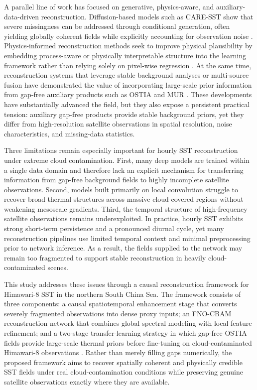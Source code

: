 \documentclass[12pt,reqno]{amsart}
\begin{document}
A parallel line of work has focused on generative, physics-aware, and auxiliary-data-driven reconstruction. Diffusion-based models such as CARE-SST show that severe missingness can be addressed through conditional generation, often yielding globally coherent fields while explicitly accounting for observation noise \cite{choo_2025_caresst}. Physics-informed reconstruction methods seek to improve physical plausibility by embedding process-aware or physically interpretable structure into the learning framework rather than relying solely on pixel-wise regression \cite{young_2024}. At the same time, reconstruction systems that leverage stable background analyses or multi-source fusion have demonstrated the value of incorporating large-scale prior information from gap-free auxiliary products such as OSTIA and MUR \cite{donlon_2012,good_2020_ostia,chin_2017,beauchamp_2025}. These developments have substantially advanced the field, but they also expose a persistent practical tension: auxiliary gap-free products provide stable background priors, yet they differ from high-resolution satellite observations in spatial resolution, noise characteristics, and missing-data statistics.

Three limitations remain especially important for hourly SST reconstruction under extreme cloud contamination. First, many deep models are trained within a single data domain and therefore lack an explicit mechanism for transferring information from gap-free background fields to highly incomplete satellite observations. Second, models built primarily on local convolution struggle to recover broad thermal structures across massive cloud-covered regions without weakening mesoscale gradients. Third, the temporal structure of high-frequency satellite observations remains underexploited. In practice, hourly SST exhibits strong short-term persistence and a pronounced diurnal cycle, yet many reconstruction pipelines use limited temporal context and minimal preprocessing prior to network inference. As a result, the fields supplied to the network may remain too fragmented to support stable reconstruction in heavily cloud-contaminated scenes.

This study addresses these issues through a causal reconstruction framework for Himawari-8 SST in the northern South China Sea. The framework consists of three components: a causal spatiotemporal enhancement stage that converts severely fragmented observations into dense proxy inputs; an FNO-CBAM reconstruction network that combines global spectral modeling with local feature refinement; and a two-stage transfer-learning strategy in which gap-free OSTIA fields provide large-scale thermal priors before fine-tuning on cloud-contaminated Himawari-8 observations \cite{donlon_2012,good_2020_ostia}. Rather than merely filling gaps numerically, the proposed framework aims to recover spatially coherent and physically credible SST fields under real cloud-contamination conditions while preserving genuine satellite observations exactly where they are available.
\end{document}
